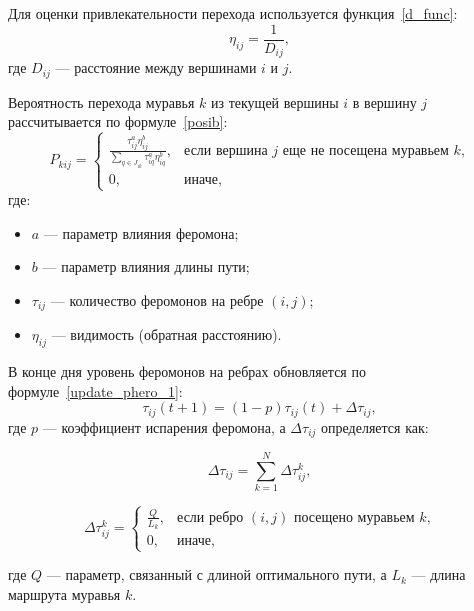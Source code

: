 \documentclass[a4paper, 12pt]{extreport}
\begin{document}
Для оценки привлекательности перехода используется функция~\eqref{d_func}:
\begin{equation}
    \label{d_func}
    \eta_{ij} = \frac{1}{D_{ij}},
\end{equation}
где $D_{ij}$ — расстояние между вершинами $i$ и $j$.

Вероятность перехода муравья $k$ из текущей вершины $i$ в вершину $j$ рассчитывается по формуле~\eqref{posib}:
\begin{equation}
    \label{posib}
    P_{kij} = 
    \begin{cases}
        \frac{\tau_{ij}^a \eta_{ij}^b}{\sum_{q \in J_{ik}} \tau_{iq}^a \eta_{iq}^b}, & \text{если вершина $j$ еще не посещена муравьем $k$,} \\
        0, & \text{иначе,}
    \end{cases}
\end{equation}
где:
\begin{itemize}
    \item $a$ — параметр влияния феромона;
    \item $b$ — параметр влияния длины пути;
    \item $\tau_{ij}$ — количество феромонов на ребре $(i, j)$;
    \item $\eta_{ij}$ — видимость (обратная расстоянию).
\end{itemize}

В конце дня уровень феромонов на ребрах обновляется по формуле~\eqref{update_phero_1}:
\begin{equation}
    \label{update_phero_1}
    \tau_{ij}(t+1) = (1-p)\tau_{ij}(t) + \Delta \tau_{ij},
\end{equation}
где $p$ — коэффициент испарения феромона, а $\Delta \tau_{ij}$ определяется как:

\begin{equation}
    \label{update_phero_2}
    \Delta \tau_{ij} = \sum_{k=1}^N \Delta \tau_{ij}^k,
\end{equation}

\begin{equation}
    \label{update_phero_3}
    \Delta \tau_{ij}^k = 
    \begin{cases}
        \frac{Q}{L_k}, & \text{если ребро $(i, j)$ посещено муравьем $k$,} \\
        0, & \text{иначе,}
    \end{cases}
\end{equation}

где $Q$ — параметр, связанный с длиной оптимального пути, а $L_k$ — длина маршрута муравья $k$.
\end{document}
